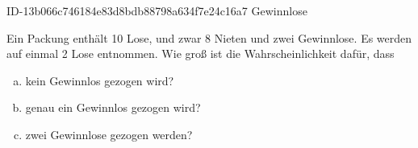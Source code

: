 \begin{exercise}
      {ID-13b066c746184e83d8bdb88798a634f7e24c16a7}
      {Gewinnlose}
  \ifproblem\problem\par
    Ein Packung enthält 10 Lose, und zwar 8 Nieten und zwei Gewinnlose.
    Es werden auf einmal 2 Lose entnommen. Wie groß ist die Wahrscheinlichkeit
    dafür, dass
    \begin{enumerate}[a)]
      \squeeze
      \item kein Gewinnlos gezogen wird?
      \item genau ein Gewinnlos gezogen wird?
      \item zwei Gewinnlose gezogen werden?
    \end{enumerate}
  \fi
\end{exercise}
